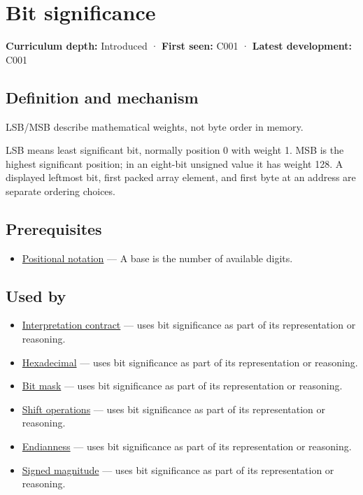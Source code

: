 \hypertarget{appendix-280445746493}{}
\section{Bit significance}\label{appendix-280445746493-bit-significance}

\textbf{Curriculum depth:} Introduced · \textbf{First seen:} C001 · \textbf{Latest development:} C001

\subsection{Definition and mechanism}\label{appendix-280445746493-definition-and-mechanism}

LSB/MSB describe mathematical weights, not byte order in memory.

LSB means least significant bit, normally position 0 with weight 1. MSB is the highest significant position; in an eight-bit unsigned value it has weight 128. A displayed leftmost bit, first packed array element, and first byte at an address are separate ordering choices.

\subsection{Prerequisites}\label{appendix-280445746493-prerequisites}

\begin{itemize}
\tightlist
\item
  \hyperref[appendix-83c3f28f7bda]{Positional notation} --- A base is the number of available digits.
\end{itemize}

\subsection{Used by}\label{appendix-280445746493-used-by}

\begin{itemize}
\tightlist
\item
  \hyperref[appendix-f414bd4ed05c]{Interpretation contract} --- uses bit significance as part of its representation or reasoning.
\item
  \hyperref[appendix-6b8075763724]{Hexadecimal} --- uses bit significance as part of its representation or reasoning.
\item
  \hyperref[appendix-dbe5905163c2]{Bit mask} --- uses bit significance as part of its representation or reasoning.
\item
  \hyperref[appendix-73425b25118e]{Shift operations} --- uses bit significance as part of its representation or reasoning.
\item
  \hyperref[appendix-bc07c3d25b18]{Endianness} --- uses bit significance as part of its representation or reasoning.
\item
  \hyperref[appendix-ce20506c8532]{Signed magnitude} --- uses bit significance as part of its representation or reasoning.
\end{itemize}


